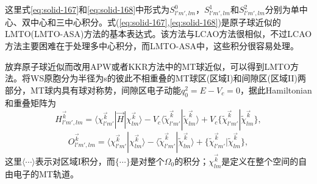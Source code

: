 这里式\eqref{eq:solid-167}和\eqref{eq:solid-168}中形式为$S_{l'm',lm}^0$，$S_{l'm',lm}^1$和$S_{l'm',lm}^2$分别为单中心、双中心和三中心积分。式(\ref{eq:solid-167},\ref{eq:solid-168})是原子球近似的LMTO(LMTO-ASA)方法的基本表达式。该方法与LCAO方法很相似，不过LCAO方法主要困难在于处理多中心积分，而LMTO-ASA中，这些积分很容易处理。

放弃原子球近似而改用APW或者KKR方法中的MT球近似，可以得到LMTO方法。将WS原胞分为半径为s的彼此不相重叠的MT球区(区域I)和间隙区(区域II)两部分，MT球内具有球对称势，间隙区电子动能$q_0^2=E-V_c=0$，据此Hamiltonian和重叠矩阵为
\begin{equation}
  H_{l'm',lm}^{\vec k}=\langle\chi_{l'm'}^{\vec k}|\vec H|\chi_{lm}^{\vec k}\rangle-V_c\langle\tilde\chi_{l'm'}^{\vec k}|\tilde\chi_{lm}^{\vec k}\rangle+V_c\{\tilde\chi_{l'm'}^{\vec k}|\tilde\chi_{lm}^{\vec k}\},
  \label{eq:solid-170}
\end{equation}
\begin{equation}
  O_{l'm',lm}^{\vec k}=\langle\chi_{l'm'}^{\vec k}|\chi_{lm}^{\vec k}\rangle-\langle\tilde\chi_{l'm'}^{\vec k}|\tilde\chi_{lm}^{\vec k}\rangle+\{\tilde\chi_{l'm'}^{\vec k}|\tilde\chi_{lm}^{\vec k}\},
  \label{eq:solid-171}
\end{equation}
这里$\langle\cdots\rangle$表示对区域I积分，而$\{\cdots\}$是对整个$\Omega_0$的积分；$\chi_{lm}^{\vec k}$是定义在整个空间的自由电子的MT轨道。


